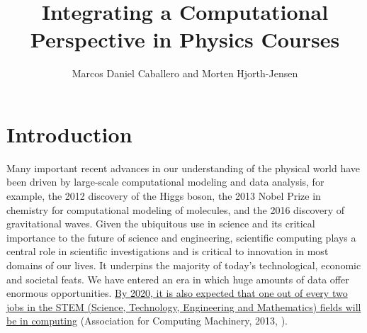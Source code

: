 \documentclass[graybox,envcountchap,sectrefs]{svmult}
\begin{document}
\title{Integrating a Computational Perspective in Physics Courses}
\author{Marcos Daniel Caballero and Morten Hjorth-Jensen}


\maketitle


\section{Introduction}

Many important recent advances in our understanding of the physical
world have been driven by large-scale computational modeling and data
analysis, for example, the 2012 discovery of the Higgs boson, the 2013
Nobel Prize in chemistry for computational modeling of molecules, and
the 2016 discovery of gravitational waves.  Given the ubiquitous use
in science and its critical importance to the future of science and
engineering, scientific computing  plays a central role in scientific
investigations and is critical to innovation in most domains of our
lives. It underpins the majority of today's technological, economic
and societal feats. We have entered an era in which huge amounts of
data offer enormous opportunities. \href{{http://pathways.acm.org/executive-summary.html}}{By 2020, it is also expected that one out of every two
jobs in the STEM (Science, Technology, Engineering and Mathematics) fields will be in
computing}
(Association for Computing Machinery, 2013, \cite{ACM2013}).
\end{document}
